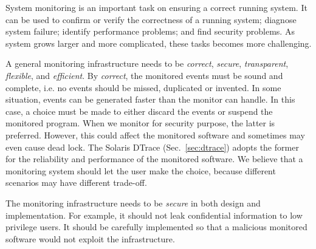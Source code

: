 
System monitoring is an important task on ensuring a correct running
system.
It can be used to confirm or verify the correctness of a running system;
diagnose system failure;
identify performance problems;
and find security problems.
As system grows larger and more complicated, these tasks becomes more challenging.

A general monitoring infrastructure needs to be
{\em correct}, {\em secure}, {\em transparent}, {\em flexible}, and {\em efficient}.
By {\em correct}, the monitored events must be sound and complete, i.e.
no events should be missed, duplicated or invented.
In some situation, events can be generated faster than the monitor can handle.
In this case, a choice must be made to either discard the events
or suspend the monitored program.
When we monitor for security purpose, the latter is preferred.
However, this could affect the monitored software and sometimes may even
cause dead lock.
The Solaris DTrace (Sec.~\ref{sec:dtrace}) adopts the former for the
reliability and performance of the monitored software.
We believe that a monitoring system should let the user make the choice,
because different scenarios may have different trade-off.

The monitoring infrastructure needs to be {\em secure} in both design and implementation.
For example, it should not leak confidential information to low privilege users.
It should be carefully implemented so that a malicious monitored
software would not exploit the infrastructure.

